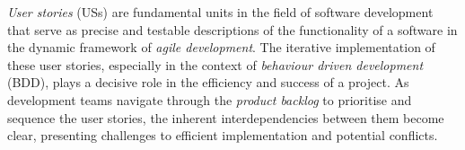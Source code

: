 %
%
%
%
%
\emph{User stories} (USs) are fundamental units in the field of software development that serve as precise and testable descriptions of the functionality of a software in the dynamic framework of \emph{agile development}. The iterative implementation of these user stories, especially in the context of \emph{behaviour driven development} (BDD), plays a decisive role in the efficiency and success of a project\cite{mosser2022modelling}. As development teams navigate through the \emph{product backlog} to prioritise and sequence the user stories, the inherent interdependencies between them become clear, presenting challenges to efficient implementation and potential conflicts.

